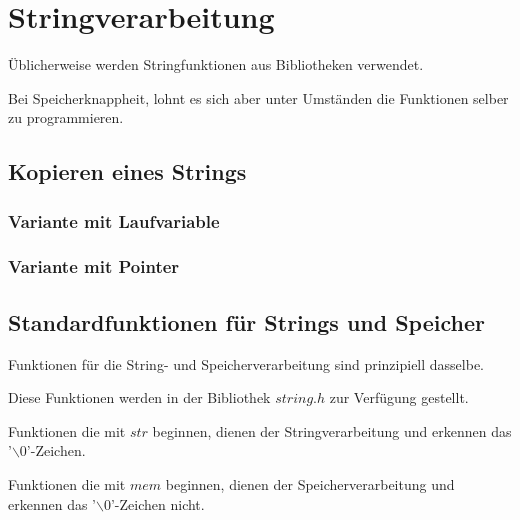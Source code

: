 \section{Stringverarbeitung}
	\begin{compactitem}
		\item Üblicherweise werden Stringfunktionen aus Bibliotheken verwendet.
		\item Bei Speicherknappheit, lohnt es sich aber unter Umständen die Funktionen selber zu programmieren.
	\end{compactitem}
	
	\subsection{Kopieren eines Strings }
		\begin{minipage}[t]{9 cm}
			\subsubsection{Variante mit Laufvariable}
				
		\end{minipage}
		\hspace*{0.5cm}
		\begin{minipage}[t]{9 cm}
			\subsubsection{Variante mit Pointer}
				
		\end{minipage}
		
	\subsection{Standardfunktionen für Strings und Speicher }
		\begin{compactitem}
			\item Funktionen für die String- und Speicherverarbeitung sind prinzipiell dasselbe.
			\item Diese Funktionen werden in der Bibliothek $string.h$ zur Verfügung gestellt.
			\item Funktionen die mit $str$ beginnen, dienen der Stringverarbeitung und erkennen das '$\backslash0$'-Zeichen.
			\item Funktionen die mit $mem$ beginnen, dienen der Speicherverarbeitung und erkennen das '$\backslash0$'-Zeichen nicht. 
		\end{compactitem}
		
